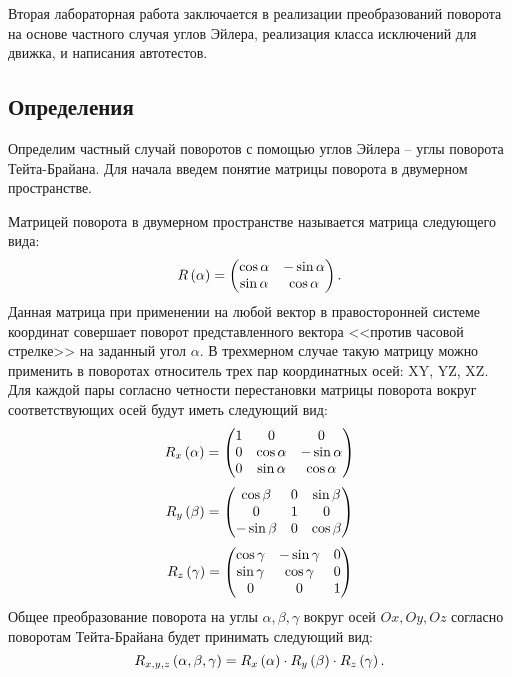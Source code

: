 Вторая лабораторная работа заключается в реализации преобразований поворота на основе частного случая углов Эйлера, реализация класса исключений для движка, и написания автотестов. 

\subsection{Определения}

	Определим частный случай поворотов с помощью углов Эйлера -- углы поворота Тейта-Брайана. Для начала введем понятие матрицы поворота в двумерном пространстве.

	Матрицей поворота в двумерном пространстве называется матрица следующего вида:
	\[ R \left( \alpha \right) = \begin{pmatrix} \cos{\alpha} & -\sin{\alpha} \\ \sin{\alpha} & \cos{\alpha} \end{pmatrix}. \]
	Данная матрица при применении на любой вектор в правосторонней системе координат совершает поворот представленного вектора <<против часовой стрелке>> на заданный угол $\alpha$. В трехмерном случае такую матрицу можно применить в поворотах относитель трех пар координатных осей: XY, YZ, XZ. Для каждой пары согласно четности перестановки матрицы поворота вокруг соответствующих осей будут иметь следующий вид:
	\[ 
		R_x \left( \alpha \right) = 
		\begin{pmatrix} 
			1 & 0 & 0 \\ 
			0 & \cos{\alpha} & -\sin{\alpha} \\ 
			0 & \sin{\alpha} & \cos{\alpha} 
		\end{pmatrix}
	\] 
	\[
		R_y \left( \beta \right) = 
		\begin{pmatrix} 
			\cos{\beta} & 0 & \sin{\beta} \\ 
			0 & 1 & 0 \\ 
			-\sin{\beta} & 0 & \cos{\beta}
		\end{pmatrix} 
	\]
	\[ 
		R_z \left( \gamma \right) = 
		\begin{pmatrix} 
			\cos{\gamma} & -\sin{\gamma} & 0 \\ 
			\sin{\gamma} & \cos{\gamma} & 0 \\ 
			0 & 0 & 1
		\end{pmatrix}
	\]
	Общее преобразование поворота на углы $\alpha, \beta, \gamma$ вокруг осей $Ox, Oy, Oz$ согласно поворотам Тейта-Брайана будет принимать следующий вид:
	\[ R_{x, y, z} \left( \alpha, \beta, \gamma \right) = R_x \left( \alpha \right) \cdot R_y \left( \beta \right) \cdot R_z \left( \gamma \right). \]

